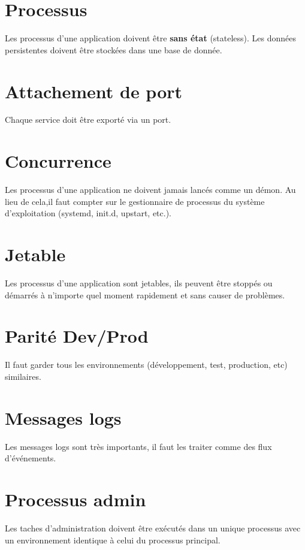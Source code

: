 \section*{Processus}

Les processus d'une application doivent être \textbf{sans état} (stateless). Les données persistentes doivent être stockées dans une base de donnée.

\section*{Attachement de port}

Chaque service doit être exporté via un port.

\section*{Concurrence}

Les processus d'une application ne doivent jamais lancés comme un démon. Au lieu de cela,il faut compter sur le gestionnaire de processus du système d'exploitation (systemd, init.d, upstart, etc.).

\section*{Jetable}

Les processus d'une application sont jetables, ils peuvent être stoppés ou démarrés à n'importe quel moment rapidement et sans causer de problèmes.

\section*{Parité Dev/Prod}

Il faut garder tous les environnements (développement, test, production, etc) similaires.

\section*{Messages logs}

Les messages logs sont très importants, il faut les traiter comme des flux d'événements.

\section*{Processus admin}

Les taches d'administration doivent être exécutés dans un unique processus avec un environnement identique à celui du processus principal.